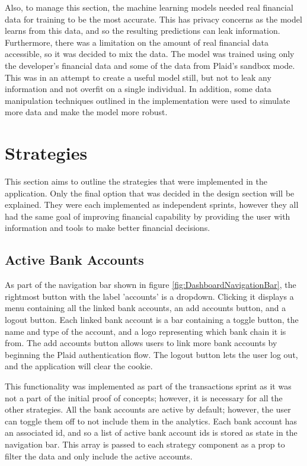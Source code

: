 Also, to manage this section, the machine learning models needed real financial data for training to be the most accurate. This has privacy concerns as the model learns from this data, and so the resulting predictions can leak information. Furthermore, there was a limitation on the amount of real financial data accessible, so it was decided to mix the data. The model was trained using only the developer's financial data and some of the data from Plaid's sandbox mode. This was in an attempt to create a useful model still, but not to leak any information and not overfit on a single individual. In addition, some data manipulation techniques outlined in the implementation were used to simulate more data and make the model more robust.

\section{Strategies}
This section aims to outline the strategies that were implemented in the application. Only the final option that was decided in the design section will be explained. They were each implemented as independent sprints, however they all had the same goal of improving financial capability by providing the user with information and tools to make better financial decisions.

\subsection{Active Bank Accounts}
As part of the navigation bar shown in figure \ref{fig:DashboardNavigationBar}, the rightmost button with the label 'accounts' is a dropdown. Clicking it displays a menu containing all the linked bank accounts, an add accounts button, and a logout button. Each linked bank account is a bar containing a toggle button, the name and type of the account, and a logo representing which bank chain it is from. The add accounts button allows users to link more bank accounts by beginning the Plaid authentication flow. The logout button lets the user log out, and the application will clear the cookie.

This functionality was implemented as part of the transactions sprint as it was not a part of the initial proof of concepts; however, it is necessary for all the other strategies. All the bank accounts are active by default; however, the user can toggle them off to not include them in the analytics. Each bank account has an associated id, and so a list of active bank account ids is stored as state in the navigation bar. This array is passed to each strategy component as a prop to filter the data and only include the active accounts.

